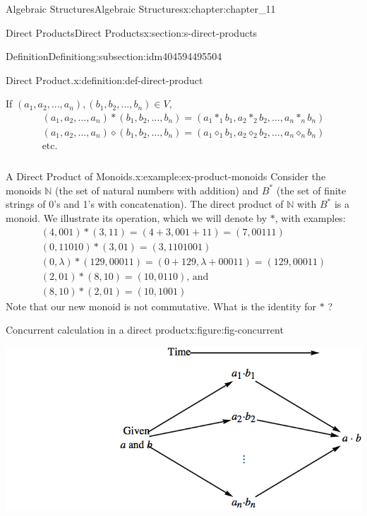 \documentclass[twoside,10pt,]{book}
\numberwithin{equation}{section}
\begin{document}
\begin{chapterptx}{Algebraic Structures}{}{Algebraic Structures}{}{}{x:chapter:chapter_11}
\begin{sectionptx}{Direct Products}{}{Direct Products}{}{}{x:section:s-direct-products}
\begin{subsectionptx}{Definition}{}{Definition}{}{}{g:subsection:idm404594495504}
\begin{definition}{Direct Product.}{x:definition:def-direct-product}
\par
If \(\left(a_1, a_2, . . . , a _n \right), \left(b_1,b_2, . . . , b _n \right)\in V\),%
\begin{equation*}
\begin{array}{c}
\left(a_1, a_2, \dots , a_n \right) * \left(b_1, b_2, \dots , b_n \right) = \left(a_1 *_1 b_1, a_2 *_2 b_2,\ldots , a_n *_n b_n \right)\\
\left(a_1, a_2, \dots , a_n \right) \diamond  \left(b_1, b_2, \dots , b_n \right) = \left(a_1 \diamond_1 b_1, a_2 \diamond_2 b_2,\dots , a_n \diamond_n b_n\right)\\
\textrm{etc.}\\
\\
\end{array}
\end{equation*}
%
\end{definition}
\begin{example}{A Direct Product of Monoids.}{x:example:ex-product-monoids}%
Consider the monoids \(\mathbb{N}\) (the set of natural numbers with addition) and \(B^*\) (the set of finite strings of 0's and 1's with concatenation). The direct product of \(\mathbb{N}\) with \(B^*\) is a monoid. We illustrate its operation, which we will denote by \(*\), with examples:%
\begin{equation*}
\begin{array}{c}
(4, 001) * (3, 11) = (4 + 3, 001+11) = (7, 00111)\\
(0, 11010) * (3,01) = (3, 1101001)\\
(0, \lambda ) * (129, 00011) = (0 + 129, \lambda +00011) = (129, 00011)\\
(2, 01) * (8, 10) = (10,0110)\textrm{, and }\\
(8, 10) * (2, 01) = (10, 1001)
\end{array}
\end{equation*}
Note that our new monoid is not commutative. What is the identity for \(*\) ?%
\end{example}
\begin{figureptx}{Concurrent calculation in a direct product}{x:figure:fig-concurrent}{}%
\begin{image}{0.15}{0.7}{0.15}%
\includegraphics[width=\linewidth]{images/fig-concurrent.png}

\end{image}
\end{figureptx}
\end{subsectionptx}
\end{sectionptx}
\end{chapterptx}
\end{document}
